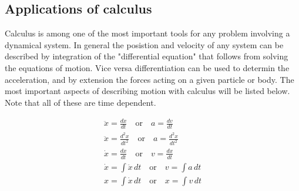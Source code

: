 \documentclass[11pt, a4paper]{article}
\begin{document}
\subsection{Applications of calculus}
Calculus is among one of the most important tools for any problem involving a dynamical system.
In general the posistion and velocity of any system can be described by integration of the "differential equation"
that follows from solving the equations of motion. Vice versa differentiation can be used to determin
the acceleration, and by extension the forces acting on a given particle or body. The most
important aspects of describing motion with calculus will be listed below. Note that all of these are time dependent.

\begin{gather*}
\ddot{x} = \frac{d\dot{x}}{dt} \quad \text{or} \quad a = \frac{dv}{dt}  \\
\ddot{x} = \frac{d^2x}{dt^2} \quad \text{or} \quad a = \frac{d^2x}{dt^2} \\
\dot{x} = \frac{dx}{dt} \quad \text{or} \quad v = \frac{dx}{dt}\\
\dot{x} = \int \ddot{x} \,dt \quad \text{or} \quad v = \int a \,dt\\
x = \int \dot{x} \,dt \quad \text{or} \quad x = \int v \,dt
\end{gather*}
\end{document}

